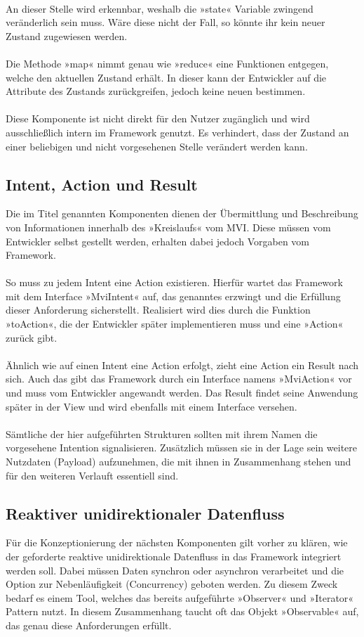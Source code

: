 \\
An dieser Stelle wird erkennbar, weshalb die »state« Variable zwingend veränderlich sein muss. Wäre diese nicht der Fall, so könnte ihr kein neuer Zustand zugewiesen werden.
\\\\
Die Methode »map« nimmt genau wie »reduce« eine Funktionen entgegen, welche den aktuellen Zustand erhält. In dieser kann der Entwickler auf die Attribute des Zustands zurückgreifen, jedoch keine neuen bestimmen.
\\\\
Diese Komponente ist nicht direkt für den Nutzer zugänglich und wird ausschließlich intern im Framework genutzt. Es verhindert, dass der Zustand an einer beliebigen und nicht vorgesehenen Stelle verändert werden kann.

\subsection{Intent, Action und Result}
\label{subsec:intent-action-und-result}
Die im Titel genannten Komponenten dienen der Übermittlung und Beschreibung von Informationen innerhalb des »Kreislaufs« vom MVI. Diese müssen vom Entwickler selbst gestellt werden, erhalten dabei jedoch Vorgaben vom Framework.
\\\\
So muss zu jedem Intent eine Action existieren. Hierfür wartet das Framework mit dem Interface »MviIntent« auf, das genanntes erzwingt und die Erfüllung dieser Anforderung sicherstellt. Realisiert wird dies durch die Funktion »toAction«, die der Entwickler später implementieren muss und eine »Action« zurück gibt.  
\\\\
Ähnlich wie auf einen Intent eine Action erfolgt, zieht eine Action ein Result nach sich. Auch das gibt das Framework durch ein Interface namens »MviAction« vor und muss vom Entwickler angewandt werden. Das Result findet seine Anwendung später in der View und wird ebenfalls mit einem Interface versehen.
\\
\\
Sämtliche der hier aufgeführten Strukturen sollten mit ihrem Namen die vorgesehene Intention signalisieren. Zusätzlich müssen sie in der Lage sein weitere Nutzdaten (Payload) aufzunehmen, die mit ihnen in Zusammenhang stehen und für den weiteren Verlauft essentiell sind.

\subsection{Reaktiver unidirektionaler Datenfluss}
\label{subsec:reaktiver-unidirektionaler-datenfluss}
Für die Konzeptionierung der nächsten Komponenten gilt vorher zu klären, wie der geforderte reaktive unidirektionale Datenfluss in das Framework integriert werden soll. Dabei müssen Daten synchron oder asynchron verarbeitet und die Option zur Nebenläufigkeit (Concurrency) geboten werden. Zu diesem Zweck bedarf es einem Tool, welches das bereits aufgeführte »Observer« und »Iterator« Pattern nutzt. In diesem Zusammenhang taucht oft das Objekt »Observable« auf, das genau diese Anforderungen erfüllt.  

